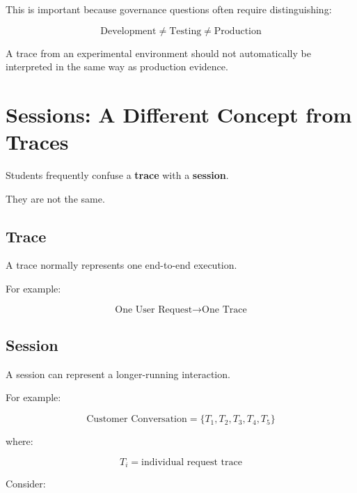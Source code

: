 \documentclass[11pt,a4paper]{article}
\begin{document}
This is important because governance questions often require distinguishing:

\[
\text{Development} \neq \text{Testing} \neq \text{Production}
\]

A trace from an experimental environment should not automatically be interpreted in the same way as production evidence.

\section{Sessions: A Different Concept from Traces}

Students frequently confuse a \textbf{trace} with a \textbf{session}.

They are not the same.

\subsection{Trace}

A trace normally represents one end-to-end execution.

For example:

\[
\text{One User Request}
\rightarrow
\text{One Trace}
\]

\subsection{Session}

A session can represent a longer-running interaction.

For example:

\[
\text{Customer Conversation} = \{ T_1,T_2,T_3,T_4,T_5 \}
\]

where:

\[
T_i = \text{individual request trace}
\]

Consider:

\begin{center}
\end{center}
\end{document}
